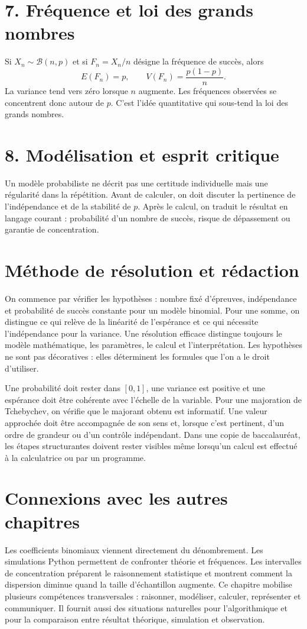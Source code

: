 \section{7. Fréquence et loi des grands nombres}
Si $X_n\sim\mathcal{B}(n,p)$ et si $F_n=X_n/n$ désigne la fréquence de succès, alors
\[
E(F_n)=p,\qquad V(F_n)=\frac{p(1-p)}{n}.
\]
La variance tend vers zéro lorsque $n$ augmente. Les fréquences observées se concentrent donc autour de $p$. C’est l’idée quantitative qui sous-tend la loi des grands nombres.

\section{8. Modélisation et esprit critique}
Un modèle probabiliste ne décrit pas une certitude individuelle mais une régularité dans la répétition. Avant de calculer, on doit discuter la pertinence de l’indépendance et de la stabilité de $p$. Après le calcul, on traduit le résultat en langage courant : probabilité d’un nombre de succès, risque de dépassement ou garantie de concentration.

\section{Méthode de résolution et rédaction}
On commence par vérifier les hypothèses : nombre fixé d’épreuves, indépendance et probabilité de succès constante pour un modèle binomial. Pour une somme, on distingue ce qui relève de la linéarité de l’espérance et ce qui nécessite l’indépendance pour la variance.
Une résolution efficace distingue toujours le modèle mathématique, les paramètres, le calcul et l’interprétation. Les hypothèses ne sont pas décoratives : elles déterminent les formules que l’on a le droit d’utiliser.

Une probabilité doit rester dans $[0,1]$, une variance est positive et une espérance doit être cohérente avec l’échelle de la variable. Pour une majoration de Tchebychev, on vérifie que le majorant obtenu est informatif.
Une valeur approchée doit être accompagnée de son sens et, lorsque c’est pertinent, d’un ordre de grandeur ou d’un contrôle indépendant. Dans une copie de baccalauréat, les étapes structurantes doivent rester visibles même lorsqu’un calcul est effectué à la calculatrice ou par un programme.

\section{Connexions avec les autres chapitres}
Les coefficients binomiaux viennent directement du dénombrement. Les simulations Python permettent de confronter théorie et fréquences. Les intervalles de concentration préparent le raisonnement statistique et montrent comment la dispersion diminue quand la taille d’échantillon augmente.
Ce chapitre mobilise plusieurs compétences transversales : raisonner, modéliser, calculer, représenter et communiquer. Il fournit aussi des situations naturelles pour l’algorithmique et pour la comparaison entre résultat théorique, simulation et observation.

